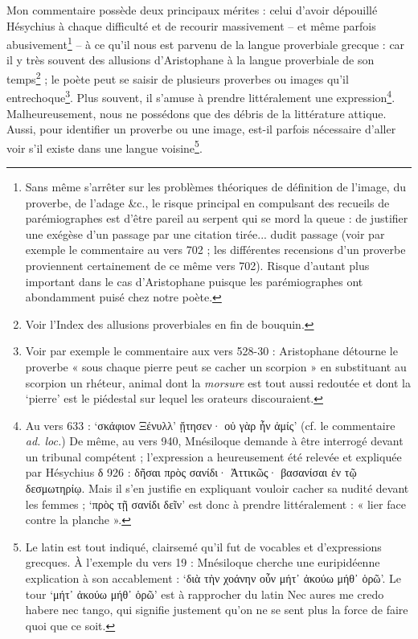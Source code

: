 \documentclass{book}%
\newcommand{\italique}[1]{\textit{#1}}%
\newcommand{\latin}[1]{{\policeLat #1}}%
\newcommand{\note}[1]{\footnote{#1}}
\begin{document}
Mon commentaire possède deux principaux mérites : celui d'avoir dépouillé Hésychius à chaque difficulté et de recourir massivement -- et même parfois abusivement\note{Sans même s'arrêter sur les problèmes théoriques de définition de l'image, du proverbe, de l'adage \&c., le risque principal en compulsant des recueils de parémiographes est d'être pareil au serpent qui se mord la queue : de justifier une exégèse d'un passage par une citation tirée... dudit passage (voir par exemple le commentaire au vers 702 ; les différentes recensions d'un proverbe proviennent certainement de ce même vers 702). Risque d'autant plus important dans le cas d'Aristophane puisque les parémiographes ont abondamment puisé chez notre poète.} -- à ce qu'il nous est parvenu de la langue proverbiale grecque : car il y très souvent des allusions d'Aristophane à la langue proverbiale de son temps\note{Voir l'Index des allusions proverbiales en fin de bouquin.} ; le poète peut se saisir de plusieurs proverbes ou images qu'il entrechoque\note{Voir par exemple le commentaire aux vers 528-30 : Aristophane détourne le proverbe « sous chaque pierre peut se cacher un scorpion » en substituant au scorpion un rhéteur, animal dont la \italique{morsure} est tout aussi redoutée et dont la `pierre' est le piédestal sur lequel les orateurs discouraient.}. Plus souvent, il s'amuse à prendre littéralement une expression\note{Au vers 633 : `σκάφιον Ξένυλλ' ᾔτησεν· οὐ γὰρ ἦν ἀμίς' (cf. le commentaire \italique{ad. loc.}) De même, au vers 940, Mnésiloque demande à être interrogé devant un tribunal compétent ; l'expression a heureusement été relevée et expliquée par Hésychius δ 926 : δῆσαι πρὸς σανίδι· Ἀττικῶς· βασανίσαι ἐν τῷ δεσμωτηρίῳ. Mais il s'en justifie en expliquant vouloir cacher sa nudité devant les femmes ; `πρὸς τῇ σανίδι δεῖν' est donc à prendre littéralement : « lier face contre la planche ».}. Malheureusement, nous ne possédons que des débris de la littérature attique. Aussi, pour identifier un proverbe ou une image, est-il parfois nécessaire d'aller voir s'il existe dans une langue voisine\note{Le latin est tout indiqué, clairsemé qu'il fut de vocables et d'expressions grecques. À l'exemple du vers 19 : Mnésiloque cherche une euripidéenne explication à son accablement : `διὰ τὴν χοάνην οὖν μήτ᾽ ἀκούω μήθ᾽ ὁρῶ'. Le tour `μήτ᾽ ἀκούω μήθ᾽ ὁρῶ' est à rapprocher du latin \latin{Nec aures me credo habere nec tango}, qui signifie justement qu'on ne se sent plus la force de faire quoi que ce soit.}.\\
\end{document}
